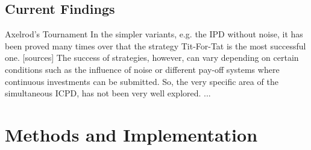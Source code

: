 \documentclass[11pt]{article}
\begin{document}
%
%
%
%

\subsection{Current Findings}

Axelrod's Tournament
In the simpler variants, e.g. the IPD without noise, it has been proved many times over that the strategy Tit-For-Tat is the most successful one. [sources]
The success of strategies, however, can vary depending on certain conditions such as the influence of noise or different pay-off systems where continuous investments can be submitted.
So, the very specific area of the simultaneous ICPD, has not been very well explored.
...

\section{Methods and Implementation}
\end{document}
